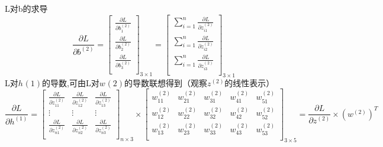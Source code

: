 \documentclass{article}
\begin{document}
	L对b的求导
	$$
	\frac{\partial L}{\partial b^{(2)}}=\left[                 
	\begin{array}{c}
	\frac{\partial L}{\partial b^{(2)}_{1}} \\  
	\frac{\partial L}{\partial b^{(2)}_{2}} \\  
	\frac{\partial L}{\partial b^{(2)}_{3}} \\  
	\end{array}
	\right]_{3\times1}=\left[                 
	\begin{array}{c}
	\sum_{i=1}^n\frac{\partial L}{\partial z^{(2)}_{i1}} \\  
	\sum_{i=1}^n\frac{\partial L}{\partial z^{(2)}_{i2}} \\  
	\sum_{i=1}^n\frac{\partial L}{\partial z^{(2)}_{i3}} \\  
	\end{array}
	\right]_{3\times1}
	$$
	L对$h^{}(1)$的导数,可由L对$w^{}(2)$的导数联想得到（观察$z^{(2)}$的线性表示）
	$$\frac{\partial L}{\partial h^{(1)}}=\left[                 
	\begin{array}{ccc}  
	\frac{\partial L}{\partial z^{(2)}_{11}} & \frac{\partial L}{\partial z^{(2)}_{12}} & \frac{\partial L}{\partial z^{(2)}_{13}} \\  
	\vdots & \vdots & \vdots \\ 
	\frac{\partial L}{\partial z^{(2)}_{n1}} & \frac{\partial L}{\partial z^{(2)}_{n2}} & \frac{\partial L}{\partial z^{(2)}_{n3}}  \\  
	\end{array}
	\right]_{n\times3}\times \left[                 
	\begin{array}{ccccc}  
	w^{(2)}_{11} & w^{(2)}_{21} & w^{(2)}_{31} &w^{(2)}_{41} &w^{(2)}_{51} \\  
	w^{(2)}_{12} & w^{(2)}_{22} & w^{(2)}_{32} &w^{(2)}_{42} &w^{(2)}_{52} \\  
	w^{(2)}_{13} & w^{(2)}_{23} & w^{(2)}_{33} &w^{(2)}_{43} &w^{(2)}_{53} \\  
	\end{array}
	\right]_{3\times5}=\frac{\partial L}{\partial z^{(2)}} \times (w^{(2)})^T
	$$
	
\end{document}
